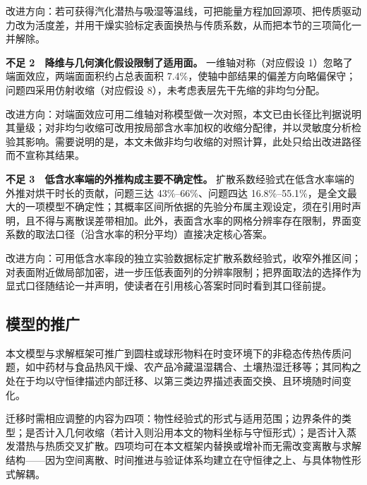 改进方向：若可获得汽化潜热与吸湿等温线，可把能量方程加回源项、把传质驱动力改为活度差，并用干燥实验标定表面换热与传质系数，从而把本节的三项简化一并解除。

\textbf{不足 2　降维与几何演化假设限制了适用面。} 一维轴对称（对应假设 1）忽略了端面效应，两端面面积约占总表面积 7.4\%，使轴中部结果的偏差方向略偏保守；问题四采用仿射收缩（对应假设 8），未考虑表层先干先缩的非均匀分配。

改进方向：对端面效应可用二维轴对称模型做一次对照，本文已由长径比判据说明其量级；对非均匀收缩可改用按局部含水率加权的收缩分配律，并以灵敏度分析检验其影响。需要说明的是，本文未做非均匀收缩的对照计算，此处只给出改进路径而不宣称其结果。

\textbf{不足 3　低含水率端的外推构成主要不确定性。} 扩散系数经验式在低含水率端的外推对烘干时长的贡献，问题三达 43\%–66\%、问题四达 16.8\%–55.1\%，是全文最大的一项模型不确定性；其概率区间所依据的先验分布属主观设定，须在引用时声明，且不得与离散误差带相加。此外，表面含水率的网格分辨率存在限制，界面变系数的取法口径（沿含水率的积分平均）直接决定核心答案。

改进方向：可用低含水率段的独立实验数据标定扩散系数经验式，收窄外推区间；对表面附近做局部加密，进一步压低表面列的分辨率限制；把界面取法的选择作为显式口径随结论一并声明，使读者在引用核心答案时同时看到其口径前提。

\subsection{模型的推广}
本文模型与求解框架可推广到圆柱或球形物料在时变环境下的非稳态传热传质问题，如中药材与食品热风干燥、农产品冷藏温湿耦合、土壤热湿迁移等；其同构之处在于均以守恒律描述内部迁移、以第三类边界描述表面交换、且环境随时间变化。

迁移时需相应调整的内容为四项：物性经验式的形式与适用范围；边界条件的类型；是否计入几何收缩（若计入则沿用本文的物料坐标与守恒形式）；是否计入蒸发潜热与热质交叉扩散。四项均可在本文框架内替换或增补而无需改变离散与求解结构——因为空间离散、时间推进与验证体系均建立在守恒律之上、与具体物性形式解耦。
